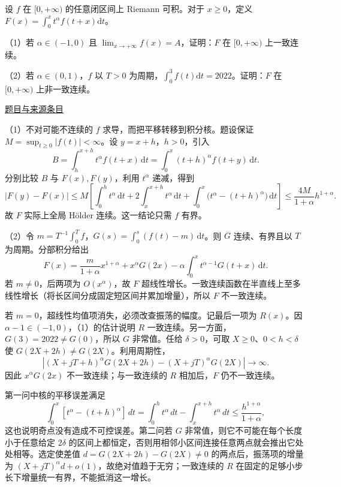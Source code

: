 \documentclass[UTF8,12pt,a4paper,fontset=fandol]{ctexart}
\begin{document}
\begin{example}[来源序号6]\label{ex:ch04-14th-A:6}\label{pr:ch04-14th-A:6}

设 $f$ 在 $[0,+\infty)$ 的任意闭区间上 Riemann 可积。对于 $x\geq 0$，定义 $F(x)=\int_{0}^{x}t^{\alpha}f(t+x)\mathrm{d}t$。

（1）若 $\alpha\in(-1,0)$ 且 $\lim_{x\rightarrow+\infty}f(x)=A$，证明：$F$ 在 $[0,+\infty)$ 上一致连续。

（2）若 $\alpha\in(0,1)$，$f$ 以 $T>0$ 为周期，$\int_{0}^{3}f(t)\mathrm{d}t=2022$。证明：$F$ 在 $[0,+\infty)$ 上非一致连续。

\par\href{https://github.com/lzxcr/cmc-mathematics/blob/64916fa1fdbc3e444a652eca204d5669058ee321/src/problems/preliminary/14/06.md}{题目与来源条目}

\end{example}

\begin{solve}\label{ans:ch04-14th-A:6}

（1）不对可能不连续的 $f$ 求导，而把平移转移到积分核。题设保证 $M=\sup_{t\geq0}|f(t)|<\infty$。设 $y=x+h$，$h>0$，引入
\[
B=\int_h^{x+h}t^\alpha f(t+x)\,\mathrm dt
=\int_0^x(t+h)^\alpha f(t+y)\,\mathrm dt.
\]
分别比较 $B$ 与 $F(x),F(y)$，利用 $t^\alpha$ 递减，得到
\[
|F(y)-F(x)|\leq M\left[
\int_0^h t^\alpha\,\mathrm dt
+2\int_x^{x+h}t^\alpha\,\mathrm dt
+\int_0^x\bigl(t^\alpha-(t+h)^\alpha\bigr)\,\mathrm dt\right]
\leq\frac{4M}{1+\alpha}h^{1+\alpha}.
\]
故 $F$ 实际上全局 Hölder 连续。这一结论只需 $f$ 有界。

（2）令 $m=T^{-1}\int_0^T f$，$G(s)=\int_0^s(f(t)-m)\,\mathrm dt$。则 $G$ 连续、有界且以 $T$ 为周期。分部积分给出
\[
F(x)=\frac{m}{1+\alpha}x^{1+\alpha}
+x^\alpha G(2x)
-\alpha\int_0^x t^{\alpha-1}G(t+x)\,\mathrm dt.
\]
若 $m\neq0$，后两项为 $O(x^\alpha)$，故 $F$ 超线性增长。一致连续函数在半直线上至多线性增长（将长区间分成固定短区间并累加增量），所以 $F$ 不一致连续。

若 $m=0$，超线性均值项消失，必须改查振荡的幅度。记最后一项为 $R(x)$。因 $\alpha-1\in(-1,0)$，（1）的估计说明 $R$ 一致连续。另一方面，$G(3)=2022\neq G(0)$，所以 $G$ 非常值。任给 $\delta>0$，可取 $X\geq0$、$0<h<\delta$ 使 $G(2X+2h)\neq G(2X)$。利用周期性，
\[
\left|(X+jT+h)^\alpha G(2X+2h)
 -(X+jT)^\alpha G(2X)\right|\longrightarrow\infty.
\]
因此 $x^\alpha G(2x)$ 不一致连续；与一致连续的 $R$ 相加后，$F$ 仍不一致连续。

第一问中核的平移误差满足
\[
\int_0^x[t^\alpha-(t+h)^\alpha]\,dt
=\int_0^h t^\alpha\,dt-\int_x^{x+h}t^\alpha\,dt
\le\frac{h^{1+\alpha}}{1+\alpha},
\]
这也说明奇点没有造成不可控误差。第二问若 $G$ 非常值，则它不可能在每个长度小于任意给定 $2\delta$ 的区间上都恒定，否则用相邻小区间连接任意两点就会推出它处处相等。选定使差值 $d=G(2X+2h)-G(2X)\ne0$ 的两点后，振荡项的增量为 $(X+jT)^\alpha d+o(1)$，故绝对值趋于无穷；一致连续的 $R$ 在固定的足够小步长下增量统一有界，不能抵消这一增长。

\end{solve}
\end{document}
